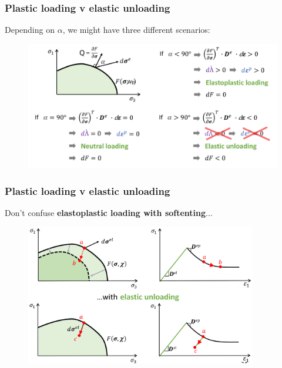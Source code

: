\documentclass[notes]{beamer}
\begin{document}
\begin{frame}
\frametitle{Plastic loading v elastic unloading}
Depending on $\alpha$, we might have three different scenarios:
\begin{figure}
	\includegraphics[width=\textwidth]{figs/loading.png}
\end{figure}
\end{frame}

\begin{frame}
\frametitle{Plastic loading v elastic unloading}
Don't confuse \textbf{elastoplastic loading with softenting}...
\begin{figure}
	\includegraphics[width=0.9\textwidth]{figs/plastic-loading-elastic-unloading.png}
\end{figure}
\end{frame}
\end{document}
